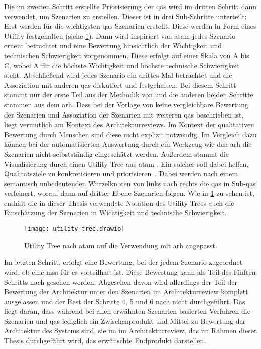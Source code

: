 Die im zweiten Schritt erstellte Priorisierung der \glspl{qa} wird im dritten Schritt dann verwendet, um Szenarien zu erstellen.
Dieser ist in drei Sub-Schritte unterteilt:
Erst werden für die wichtigsten \glspl{qa} Szenarien erstellt.
Diese werden in Form eines Utility festgehalten (siehe \cref{fig:utility-tree}).
Dann wird inspiriert von \gls{atam} \cite{kazman_2000} jedes Szenario erneut betrachtet und eine Bewertung hinsichtlich der Wichtigkeit und technischen Schwierigkeit vorgenommen.
Diese erfolgt auf einer Skala von A bis C, wobei A für die höchste Wichtigkeit und höchste technische Schwierigkeit steht.
Abschließend wird jedes Szenario ein drittes Mal betrachtet und die Assoziation mit anderen \glspl{qa} diskutiert und festgehalten.
Bei diesem Schritt stammt nur der erste Teil aus der Methodik von  und die anderen beiden Schritte stammen aus dem \gls{arh}.
Dass bei der Vorlage von  keine vergleichbare Bewertung der Szenarien und Assoziation der Szenarien mit weiteren \glspl{qa} beschrieben ist, liegt vermutlich am Kontext des Architekturreviews.
Im Kontext der qualitativen Bewertung durch Menschen sind diese nicht explizit notwendig.
Im Vergleich dazu können bei der automatisierten Auswertung durch ein Werkzeug wie den \gls{arh} die Szenarien nicht selbstständig eingeschätzt werden.
Außerdem stammt die Visualisierung durch einen Utility Tree aus \gls{atam} \cite{kazman_2000}.
Ein solcher soll dabei helfen, Qualitätsziele zu konkretisieren und priorisieren~\cite{kazman_2000}.
Dabei werden nach einem semantisch unbedeutenden Wurzelknoten von links nach rechts die \glspl{qa} in Sub-\glspl{qa} verfeinert, worauf dann auf dritter Ebene Szenarien folgen.
Wie in \cref{fig:utility-tree} zu sehen ist, enthält die in dieser Thesis verwendete Notation des Utility Trees auch die Einschätzung der Szenarien in Wichtigkeit und technische Schwierigkeit.
\begin{figure}[!h]
	\centering
	\texttt{[image: utility-tree.drawio]}
	\caption[Utility Tree nach \gls{atam} \cite{kazman_2000}]{
		Utility Tree nach \gls{atam} \cite{kazman_2000} auf die Verwendung mit \gls{arh} angepasst.
	}
	\label{fig:utility-tree}
\end{figure}


Im letzten Schritt, erfolgt eine Bewertung, bei der jedem Szenario zugeordnet wird, ob eine \gls{msa} für es vorteilhaft ist.
Diese Bewertung kann als Teil des fünften Schritts nach  gesehen werden.
Abgesehen davon wird allerdings der Teil der Bewertung der Architektur unter den Szenarien im Architekturreview komplett ausgelassen und der Rest der Schritte 4, 5 und 6 nach  nicht durchgeführt.
Das liegt daran, dass während bei allen erwähnten Szenarien-basierten Verfahren die Szenarien und \glspl{qa} lediglich ein Zwischenprodukt und Mittel zu Bewertung der Architektur des Systems sind, sie im im Architekturreview, das im Rahmen dieser Thesis durchgeführt wird, das erwünschte Endprodukt darstellen.


